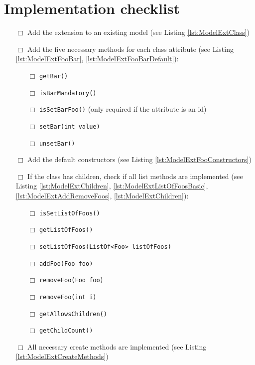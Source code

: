 \section{Implementation checklist}
    \begin{itemize}
        \item [$\Box$] Add the extension to an existing model (see Listing \ref{lst:ModelExtClass})
        \item [$\Box$] Add the five necessary methods for each class attribute (see Listing \ref{lst:ModelExtFooBar}, \ref{lst:ModelExtFooBarDefault}):
            \begin{itemize}
              \item [$\Box$] \texttt{getBar()}
              \item [$\Box$] \texttt{isBarMandatory()}
              \item [$\Box$] \texttt{isSetBarFoo()} (only required if the attribute is an id)
              \item [$\Box$] \texttt{setBar(int value)}
              \item [$\Box$] \texttt{unsetBar()}
            \end{itemize}
        \item [$\Box$] Add the default constructors (see Listing \ref{lst:ModelExtFooConstructors})
        \item [$\Box$] If the class has children, check if all list methods are implemented (see Listing \ref{lst:ModelExtChildren}, \ref{lst:ModelExtListOfFoosBasic}, \ref{lst:ModelExtAddRemoveFoos}, \ref{lst:ModelExtChildren}):
            \begin{itemize}
              \item [$\Box$] \texttt{isSetListOfFoos()}
              \item [$\Box$] \texttt{getListOfFoos()}
              \item [$\Box$] \texttt{setListOfFoos(ListOf<Foo> listOfFoos)}
              \item [$\Box$] \texttt{addFoo(Foo foo)}
              \item [$\Box$] \texttt{removeFoo(Foo foo)}
              \item [$\Box$] \texttt{removeFoo(int i)}
              \item [$\Box$] \texttt{getAllowsChildren()}
              \item [$\Box$] \texttt{getChildCount()}
            \end{itemize}
        \item [$\Box$] All necessary create methods are implemented (see Listing \ref{lst:ModelExtCreateMethods})

\end{itemize}
